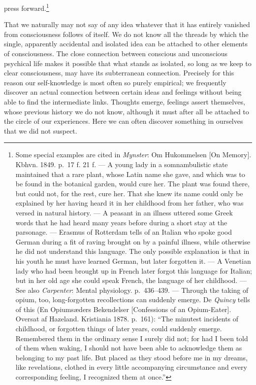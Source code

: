 \documentclass[12pt,a4paper]{book}
\newcommand{\opage}[1]{\marginnote{\footnotesize\textit{[#1]}}}
\begin{document}
press forward.\footnote{Some special examples are cited in
\emph{Mynster}: Om Hukommelsen [On Memory]. Kbhvn. 1849. p.~17 f. 21 f.
--- A young lady in a somnambulistic state maintained that a rare plant,
whose Latin name she gave, and which was to be found in the botanical
garden, would cure her. The plant was found there, but could not, for the
rest, cure her. That she knew its name could only be explained by her
having heard it in her childhood from her father, who was versed in
natural history. --- A peasant in an illness uttered some Greek words that
he had heard many years before during a short stay at the parsonage. ---
Erasmus of Rotterdam tells of an Italian who spoke good German during a
fit of raving brought on by a painful illness, while otherwise he did not
understand this language. The only possible explanation is that in his
youth he must have learned German, but later forgotten it. --- A Venetian
lady who had been brought up in French later forgot this language for
Italian; but in her old age she could speak French, the language of her
childhood. --- See also \emph{Carpenter}: Mental physiology.
p.~436--439. --- Through the taking of opium, too, long-forgotten
recollections can suddenly emerge. De \emph{Quincy} tells of this (En
Opiumsæders Bekendelser [Confessions of an Opium-Eater]. Oversat af
Hazeland. Kristiania 1878. p.~161): ``The minutest incidents of childhood,
or forgotten things of later years, could suddenly emerge. Remembered
them in the ordinary sense I surely did not; for had I been told of them
when waking, I should not have been able to acknowledge them as belonging
to my past life. But placed as they stood before me in my dreams, like
revelations, clothed in every little accompanying circumstance and every
corresponding feeling, I recognized them at once.''}

That we naturally may not say of any idea whatever that it has entirely
vanished from consciousness follows of itself. We do not know all the
threads by which the single, apparently accidental and isolated idea can
\opage{175}be attached to other elements of consciousness. The close
connection between conscious and unconscious psychical life makes it
possible that what stands as isolated, so long as we keep to clear
consciousness, may have its subterranean connection. Precisely for this
reason our self-knowledge is most often so purely empirical; we frequently
discover an actual connection between certain ideas and feelings without
being able to find the intermediate links. Thoughts emerge, feelings
assert themselves, whose previous history we do not know, although it
must after all be attached to the circle of our experiences. Here we can
often discover something in ourselves that we did not suspect.
\end{document}
